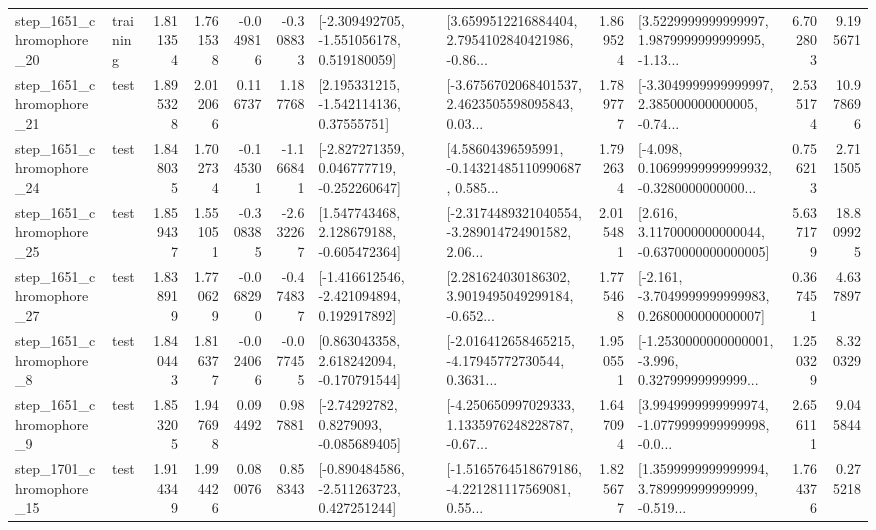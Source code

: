 \begin{tabular}{llrrrrllrlrr}
 step\_1651\_chromophore\_20 &  training &      1.811354 &    1.761538 &     -0.049816 & -0.308833 &   [-2.309492705, -1.551056178, 0.519180059] &  [3.6599512216884404, 2.7954102840421986, -0.86... &       1.869524 &  [3.5229999999999997, 1.9879999999999995, -1.13... &            6.702803 &          9.195671 \\
 step\_1651\_chromophore\_21 &      test &      1.895328 &    2.012066 &      0.116737 &  1.187768 &     [2.195331215, -1.542114136, 0.37555751] &  [-3.6756702068401537, 2.4623505598095843, 0.03... &       1.789777 &  [-3.3049999999999997, 2.385000000000005, -0.74... &            2.535174 &         10.978696 \\
 step\_1651\_chromophore\_24 &      test &      1.848035 &    1.702734 &     -0.145301 & -1.166841 &   [-2.827271359, 0.046777719, -0.252260647] &  [4.58604396595991, -0.14321485110990687, 0.585... &       1.792634 &  [-4.098, 0.10699999999999932, -0.3280000000000... &            0.756213 &          2.711505 \\
 step\_1651\_chromophore\_25 &      test &      1.859437 &    1.551051 &     -0.308385 & -2.632267 &    [1.547743468, 2.128679188, -0.605472364] &  [-2.3174489321040554, -3.289014724901582, 2.06... &       2.015481 &   [2.616, 3.1170000000000044, -0.6370000000000005] &            5.637179 &         18.809925 \\
 step\_1651\_chromophore\_27 &      test &      1.838919 &    1.770629 &     -0.068290 & -0.474837 &   [-1.416612546, -2.421094894, 0.192917892] &  [2.281624030186302, 3.9019495049299184, -0.652... &       1.775468 &  [-2.161, -3.7049999999999983, 0.2680000000000007] &            0.367451 &          4.637897 \\
  step\_1651\_chromophore\_8 &      test &      1.840443 &    1.816377 &     -0.024066 & -0.077455 &    [0.863043358, 2.618242094, -0.170791544] &  [-2.016412658465215, -4.17945772730544, 0.3631... &       1.950551 &  [-1.2530000000000001, -3.996, 0.32799999999999... &            1.250329 &          8.320329 \\
  step\_1651\_chromophore\_9 &      test &      1.853205 &    1.947698 &      0.094492 &  0.987881 &      [-2.74292782, 0.8279093, -0.085689405] &  [-4.250650997029333, 1.1335976248228787, -0.67... &       1.647094 &  [3.9949999999999974, -1.0779999999999998, -0.0... &            2.656111 &          9.045844 \\
 step\_1701\_chromophore\_15 &      test &      1.914349 &    1.994426 &      0.080076 &  0.858343 &   [-0.890484586, -2.511263723, 0.427251244] &  [-1.5165764518679186, -4.221281117569081, 0.55... &       1.825677 &  [1.3599999999999994, 3.789999999999999, -0.519... &            1.764376 &          0.275218 \\

\end{tabular}
